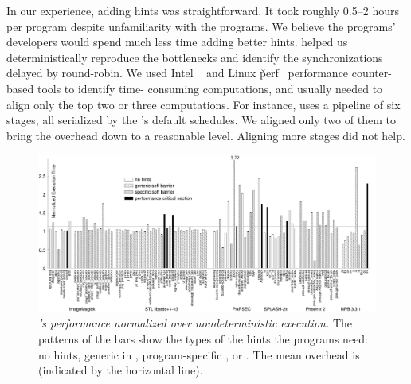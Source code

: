 In our experience, adding hints was straightforward.  It took roughly 0.5--2 
hours per program despite unfamiliarity with the programs.  We believe
the programs' developers would spend much less time adding better hints.
\parrot helped us deterministically reproduce the bottlenecks and identify
the synchronizations delayed by round-robin.  We used Intel \vtune~\cite{vtune} and
Linux \v{perf}~\cite{perf} performance counter-based tools to identify time-
consuming computations, and usually needed to align only the top two or three
computations.  For instance, \ferret uses a pipeline of six stages, all
serialized by the \parrot's default schedules.  We aligned only two of them to 
bring the overhead down to a reasonable level.  Aligning more stages did not help.




\begin{figure}[tb]
\includegraphics[width=0.6\columnwidth]{parrot/figures/overhead}
\caption{{\em \parrot's performance normalized over nondeterministic
    execution.}  The patterns of the bars show the types of the hints the 
programs
  need: no hints, generic \computes in \libgomp, program-specific
  \computes, or \nondets.  The mean overhead is
  \meanoverhead (indicated by the horizontal line).} \label{fig:overhead}
\vspace{-.05in}
\end{figure}





